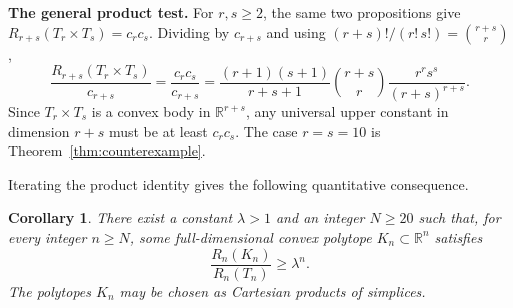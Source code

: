 \documentclass[11pt]{article}
\newtheorem{corollary}[theorem]{Corollary}
\newcommand{\R}{\mathbb R}
\begin{document}
\noindent\textbf{The general product test.} For \(r,s\ge2\), the same two
propositions give \(R_{r+s}(T_r\times T_s)=c_rc_s\). Dividing by
\(c_{r+s}\) and using \((r+s)!/(r!\,s!)=\binom{r+s}{r}\),
\[
 \frac{R_{r+s}(T_r\times T_s)}{c_{r+s}}
 =\frac{c_rc_s}{c_{r+s}}
 =\frac{(r+1)(s+1)}{r+s+1}
   \binom{r+s}{r}\frac{r^rs^s}{(r+s)^{r+s}}.
\]
Since \(T_r\times T_s\) is a convex body in \(\R^{r+s}\), any universal
upper constant in dimension \(r+s\) must be at least \(c_rc_s\). The case
\(r=s=10\) is Theorem~\ref{thm:counterexample}.

Iterating the product identity gives the following quantitative
consequence.

\begin{corollary}\label{cor:exponential-excess}
There exist a constant \(\lambda>1\) and an integer \(N\ge20\) such that,
for every integer \(n\ge N\), some full-dimensional convex polytope
\(K_n\subset\R^n\) satisfies
\[
 \frac{R_n(K_n)}{R_n(T_n)}\ge\lambda^n.
\]
The polytopes \(K_n\) may be chosen as Cartesian products of simplices.
\end{corollary}
\end{document}

